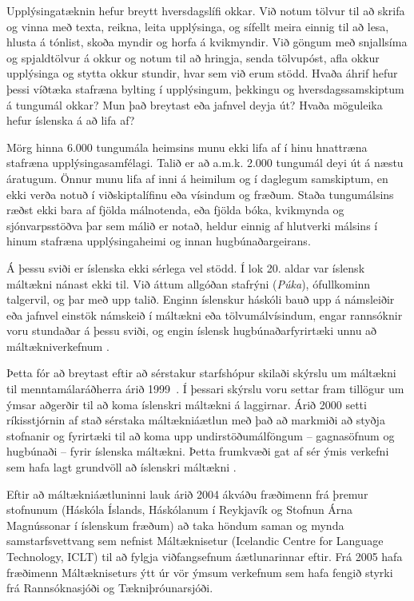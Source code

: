 \begin{multicols}{2}
Upplýsingatæknin hefur breytt hversdagslífi okkar. Við notum tölvur til að skrifa og vinna með texta, reikna, leita upplýsinga, og sífellt meira einnig til að lesa, hlusta á tónlist, skoða myndir og horfa á kvikmyndir. Við göngum með snjallsíma og  spjaldtölvur á okkur og notum til að hringja, senda tölvupóst, afla okkur upplýsinga og stytta okkur stundir, hvar sem við erum stödd. Hvaða áhrif hefur þessi víðtæka stafræna bylting í upplýsingum, þekkingu og hversdagssamskiptum á tungumál okkar? Mun það breytast eða jafnvel deyja út? Hvaða möguleika hefur íslenska á að lifa af?

Mörg hinna 6.000 tungumála heimsins munu ekki lifa af í hinu hnattræna stafræna upplýsingasamfélagi. Talið er að a.m.k. 2.000 tungumál deyi út á næstu áratugum. Önnur munu lifa af inni á heimilum og í daglegum samskiptum, en ekki verða notuð í viðskiptalífinu eða vísindum og fræðum. Staða tungumálsins ræðst ekki bara af fjölda málnotenda, eða fjölda bóka, kvikmynda og sjónvarpsstöðva þar sem málið er notað, heldur einnig af hlutverki málsins í hinum stafræna upplýsingaheimi og innan hugbúnaðargeirans.

Á þessu sviði er íslenska ekki sérlega vel stödd. Í lok 20. aldar var íslensk máltækni nánast ekki til. Við áttum allgóðan stafrýni (\textit{Púka}), ófullkominn talgervil, og þar með upp talið. Enginn íslenskur háskóli bauð upp á námsleiðir eða jafnvel einstök námskeið í máltækni eða tölvumálvísindum, engar rannsóknir voru stundaðar á þessu sviði, og engin íslensk hugbúnaðarfyrirtæki unnu að máltækniverkefnum \cite{ilrt1}.

Þetta fór að breytast eftir að sérstakur starfshópur skilaði skýrslu um máltækni til menntamálaráðherra árið 1999~\cite{sky1}. Í þessari skýrslu voru settar fram tillögur um ýmsar aðgerðir til að koma íslenskri máltækni á laggirnar. Árið 2000 setti ríkisstjórnin af stað sérstaka máltækniáætlun með það að markmiði að styðja stofnanir og fyrirtæki til að koma upp undirstöðumálföngum -- gagnasöfnum og hugbúnaði -- fyrir íslenska máltækni. Þetta frumkvæði gat af sér ýmis verkefni sem hafa lagt grundvöll að íslenskri máltækni \cite{ilrt1}.

Eftir að máltækniáætluninni lauk árið 2004 ákváðu fræðimenn frá þremur stofnunum (Háskóla Íslands, Háskólanum í Reykjavík og Stofnun Árna Magnússonar í íslenskum fræðum) að taka höndum saman og mynda samstarfsvettvang sem nefnist Máltæknisetur (Icelandic Centre for Language Technology, ICLT) \cite{iclt1} til að fylgja viðfangsefnum áætlunarinnar eftir. Frá 2005 hafa fræðimenn Máltækniseturs ýtt úr vör ýmsum verkefnum sem hafa fengið styrki frá Rannsóknasjóði og Tækniþróunarsjóði. 


\end{multicols}
